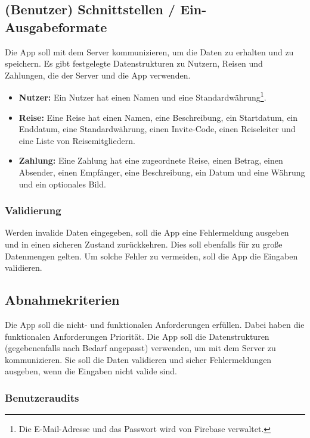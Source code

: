 \subsection{(Benutzer) Schnittstellen / Ein-Ausgabeformate}

Die App soll mit dem Server kommunizieren, um die Daten zu erhalten und zu speichern.
Es gibt festgelegte Datenstrukturen zu Nutzern, Reisen und Zahlungen, die der Server und die App verwenden.

\begin{itemize}
	\item \textbf{Nutzer:} Ein Nutzer hat einen Namen und eine Standardwährung\footnote{Die E-Mail-Adresse und das Passwort wird von Firebase verwaltet.}.
	\item \textbf{Reise:} Eine Reise hat einen Namen, eine Beschreibung, ein Startdatum, ein Enddatum, eine Standardwährung, einen Invite-Code, einen Reiseleiter und eine Liste von Reisemitgliedern.
	\item \textbf{Zahlung:} Eine Zahlung hat eine zugeordnete Reise, einen Betrag, einen Absender, einen Empfänger, eine Beschreibung, ein Datum und eine Währung und ein optionales Bild.
\end{itemize}

\subsubsection{Validierung}

Werden invalide Daten eingegeben, soll die App eine Fehlermeldung ausgeben und in einen sicheren Zustand zurückkehren.
Dies soll ebenfalls für zu große Datenmengen gelten.
Um solche Fehler zu vermeiden, soll die App die Eingaben validieren.

\subsection{Abnahmekriterien}

Die App soll die nicht- und funktionalen Anforderungen erfüllen.
Dabei haben die funktionalen Anforderungen Priorität.
Die App soll die Datenstrukturen (gegebenenfalls nach Bedarf angepasst) verwenden, um mit dem Server zu kommunizieren.
Sie soll die Daten validieren und sicher Fehlermeldungen ausgeben, wenn die Eingaben nicht valide sind.

\subsubsection{Benutzeraudits}

